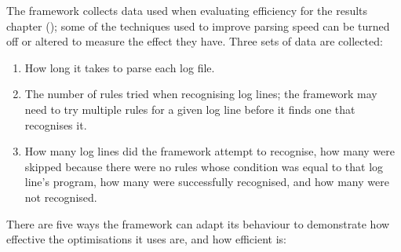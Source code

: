 The framework collects data used when evaluating \parsernames{} efficiency
for the results chapter (); some of the techniques used
to improve parsing speed can be turned off or altered to measure the effect
they have.  Three sets of data are collected:

\begin{enumerate}

    \item How long it takes to parse each log file.

    \item The number of rules tried when recognising log lines; the
        framework may need to try multiple rules for a given log line
        before it finds one that recognises it.

    \item How many log lines did the framework attempt to recognise, how
        many were skipped because there were no rules whose condition was
        equal to that log line's program, how many were successfully
        recognised, and how many were not recognised.

\end{enumerate}

There are five ways the framework can adapt its behaviour to demonstrate
how effective the optimisations it uses are, and how efficient
\parsername{} is:

